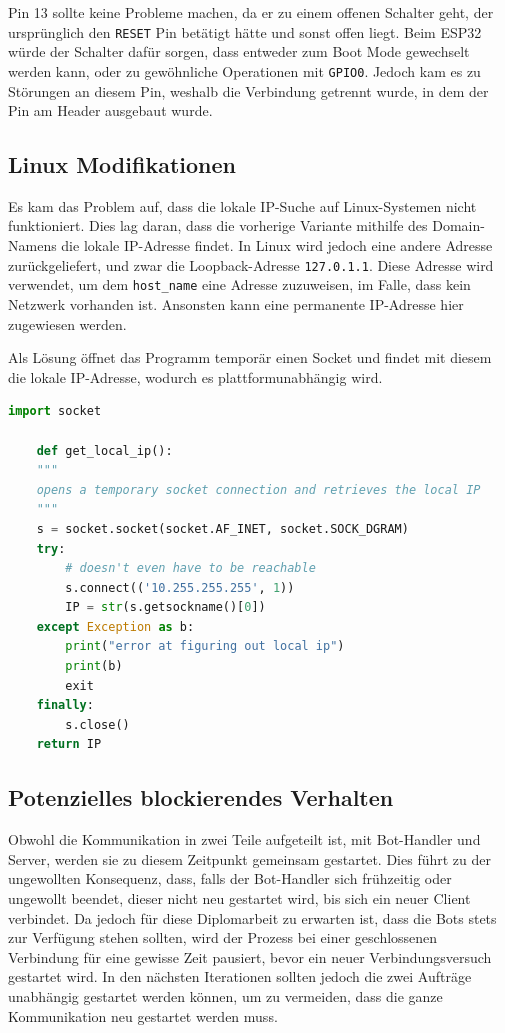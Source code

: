Pin 13 sollte keine Probleme machen, da er zu einem offenen Schalter geht,
der ursprünglich den \texttt{RESET} Pin betätigt hätte und sonst offen liegt.
%
Beim ESP32 würde der Schalter dafür sorgen, 
dass entweder zum Boot Mode gewechselt werden kann, 
oder zu gewöhnliche Operationen mit \texttt{GPIO0}.
%
Jedoch kam es zu Störungen an diesem Pin, 
weshalb die Verbindung getrennt wurde,
in dem der Pin am Header ausgebaut wurde.

\subsection{Linux Modifikationen}
Es kam das Problem auf, 
dass die lokale IP-Suche auf Linux-Systemen nicht funktioniert.
%
Dies lag daran,
dass die vorherige Variante mithilfe des Domain-Namens die lokale IP-Adresse findet.
%
In Linux wird jedoch eine andere Adresse zurückgeliefert, 
und zwar die Loopback-Adresse \texttt{127.0.1.1}.
%
Diese Adresse wird verwendet,
um dem \texttt{host\_name} eine Adresse zuzuweisen,
im Falle, dass kein Netzwerk vorhanden ist.
%
Ansonsten kann eine permanente IP-Adresse hier zugewiesen werden.

Als Lösung öffnet das Programm temporär einen Socket 
und findet mit diesem die lokale IP-Adresse,
wodurch es plattformunabhängig wird.
\begin{lstlisting}[language=python, gobble=4]
    import socket

    def get_local_ip():
    """
    opens a temporary socket connection and retrieves the local IP
    """
    s = socket.socket(socket.AF_INET, socket.SOCK_DGRAM)
    try:
        # doesn't even have to be reachable
        s.connect(('10.255.255.255', 1))
        IP = str(s.getsockname()[0])
    except Exception as b:
        print("error at figuring out local ip")
        print(b)
        exit
    finally:
        s.close()
    return IP
\end{lstlisting}

\subsection{Potenzielles blockierendes Verhalten}
Obwohl die Kommunikation in zwei Teile aufgeteilt ist, 
mit Bot-Handler und Server, 
werden sie zu diesem Zeitpunkt gemeinsam gestartet.
%
Dies führt zu der ungewollten Konsequenz, dass,
falls der Bot-Handler sich frühzeitig oder ungewollt beendet,
dieser nicht neu gestartet wird, bis sich ein neuer Client verbindet.
% 
Da jedoch für diese Diplomarbeit zu erwarten ist, 
dass die Bots stets zur Verfügung stehen sollten,
wird der Prozess bei einer geschlossenen Verbindung für eine gewisse Zeit pausiert,
bevor ein neuer Verbindungsversuch gestartet wird.
%
In den nächsten Iterationen sollten jedoch 
die zwei Aufträge unabhängig gestartet werden können, 
um zu vermeiden,
dass die ganze Kommunikation neu gestartet werden muss.

